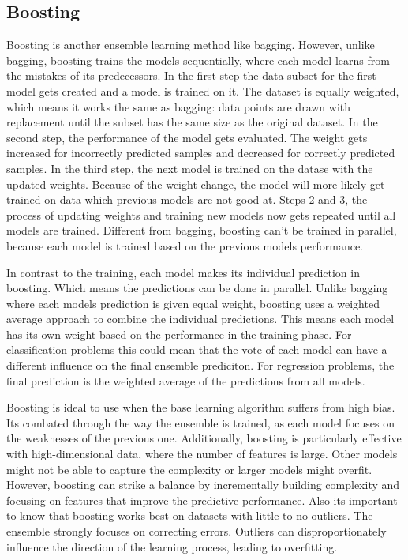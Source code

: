 
\subsection{Boosting}
Boosting \citep{Schapire1990} is another ensemble learning method like bagging.
However, unlike bagging, boosting trains the models sequentially, where each
model learns from the mistakes of its predecessors.
In the first step the data subset for the first model gets created and a model 
is trained on it. The dataset is equally weighted, which means it works the same 
as bagging: data points are drawn with replacement until the subset has the same
size as the original dataset.
In the second step, the performance of the model gets evaluated. The weight gets
increased for incorrectly predicted samples and decreased for correctly predicted
samples. 
In the third step, the next model is trained on the datase with the updated weights.
Because of the weight change, the model will more likely get trained on data which
previous models are not good at.
Steps 2 and 3, the process of updating weights and training new models now gets 
repeated until all models are trained.
Different from bagging, boosting can't be trained in parallel, because each model
is trained based on the previous models performance. 


In contrast to the training, each model makes its individual prediction in boosting.
Which means the predictions can be done in parallel.
Unlike bagging where each models prediction is given equal weight, boosting uses
a weighted average approach to combine the individual predictions. This means
each model has its own weight based on the performance in the training phase.
For classification problems this could mean that the vote of each model can have
a different influence on the final ensemble prediciton.
For regression problems, the final prediction is the weighted average of the
predictions from all models.

Boosting is ideal to use when the base learning algorithm suffers from high bias.
Its combated through the way the ensemble is trained, as each model focuses on the
weaknesses of the previous one.
Additionally, boosting is particularly effective with high-dimensional data, where
the number of features is large. Other models might not be able to capture the 
complexity or larger models might overfit. However, boosting can strike a 
balance by incrementally building complexity and focusing on features that improve
the predictive performance.
Also its important to know that boosting works best on datasets with little to no
outliers. The ensemble strongly focuses on correcting errors. Outliers can 
disproportionately influence the direction of the learning process, leading
to overfitting.


